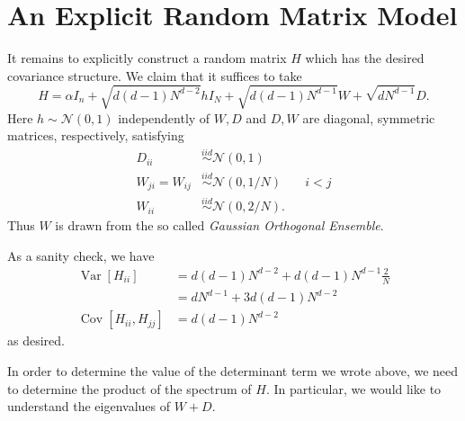 \documentclass[12pt]{article}
\DeclareMathOperator{\Var}{Var}
\DeclareMathOperator{\Cov}{Cov}
\newcommand{\mcal}{\mathcal}
\newcommand{\Sim}[1]{\stackrel{#1}{\sim}}
\begin{document}
\section{An Explicit Random Matrix Model}
It remains to explicitly construct a random matrix $H$
which has the desired covariance structure.
We claim that it suffices to take
\[
  H
  = \alpha I_n
  + \sqrt{d(d-1) N^{d-2}} h I_N
  + \sqrt{d(d-1) N^{d-1}} W
  + \sqrt{dN^{d-1}} D.
\]
Here $h\sim \mcal N(0, 1)$ independently of $W, D$
and $D, W$ are diagonal, symmetric matrices, respectively,
satisfying
\begin{align*}
  D_{ii} &\Sim{iid} \mcal N(0, 1) \\
  W_{ji} = W_{ij} &\Sim{iid} \mcal N(0, 1/N) &&i < j \\
  W_{ii} &\Sim{iid} \mcal N(0, 2/N).
\end{align*}
Thus $W$ is drawn from the so called \emph{Gaussian Orthogonal Ensemble}.

As a sanity check,
we have
\begin{align*}
  \Var[H_{ii}]
  &= d(d-1) N^{d-2} + d(d-1) N^{d-1} \frac2N \\
  &= dN^{d-1} + 3d(d-1) N^{d-2} \\
  \Cov[H_{ii}, H_{jj}]
  &= d(d-1) N^{d-2}
\end{align*}
as desired.

In order to determine the value of the determinant term
we wrote above,
we need to determine the product of the spectrum of $H$.
In particular,
we would like to understand the eigenvalues of $W + D$.
\end{document}
